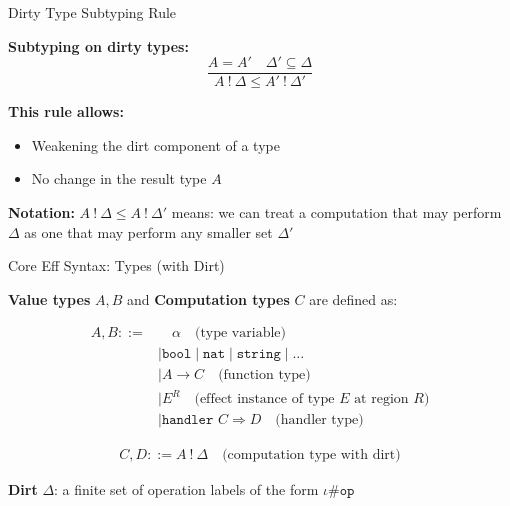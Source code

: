 \begin{frame}{Dirty Type Subtyping Rule}

\textbf{Subtyping on dirty types:}
\[
\frac{A = A' \quad \Delta' \subseteq \Delta}
{A\ !\ \Delta \leq A'\ !\ \Delta'}
\]

\vspace{1em}
\textbf{This rule allows:}
\begin{itemize}
  \item Weakening the dirt component of a type
  \item No change in the result type \( A \)
\end{itemize}

\vspace{1em}
\textbf{Notation:} \( A\ !\ \Delta \leq A\ !\ \Delta' \)  
means: we can treat a computation that may perform \( \Delta \) as one that may perform any smaller set \( \Delta' \)
\end{frame}

\begin{frame}{Core Eff Syntax: Types (with Dirt)}

\textbf{Value types} \( A, B \) and \textbf{Computation types} \( C \) are defined as:

\begin{align*}
A, B ::= &\quad \alpha \quad \text{(type variable)} \\
        &\mid \texttt{bool} \mid \texttt{nat} \mid \texttt{string} \mid \dots \\
        &\mid A \rightarrow C \quad \text{(function type)} \\
        &\mid E^R \quad \text{(effect instance of type } E \text{ at region } R) \\
        &\mid \texttt{handler } C \Rightarrow D \quad \text{(handler type)}
\end{align*}

\vspace{0.5em}

\begin{align*}
C, D ::= A\ !\ \Delta \quad \text{(computation type with dirt)}
\end{align*}

\vspace{1em}

\textbf{Dirt} \( \Delta \): a finite set of operation labels of the form \( \iota \# \texttt{op} \)

\end{frame}

